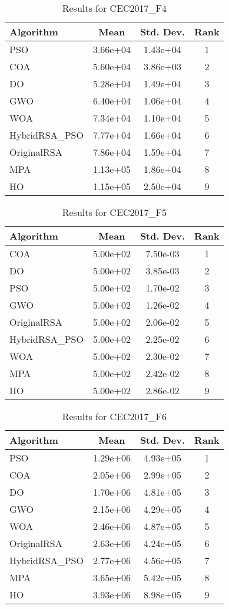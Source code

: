 \documentclass[12pt]{article}
\begin{document}
\begin{table}[H]
\centering
\caption{Results for CEC2017\_F4}
\begin{tabular}{|l|c|c|c|}
\hline
\textbf{Algorithm} & \textbf{Mean} & \textbf{Std. Dev.} & \textbf{Rank} \\
\hline
PSO & 3.66e+04 & 1.43e+04 & 1 \\
COA & 5.60e+04 & 3.86e+03 & 2 \\
DO & 5.28e+04 & 1.49e+04 & 3 \\
GWO & 6.40e+04 & 1.06e+04 & 4 \\
WOA & 7.34e+04 & 1.10e+04 & 5 \\
HybridRSA\_PSO & 7.77e+04 & 1.66e+04 & 6 \\
OriginalRSA & 7.86e+04 & 1.59e+04 & 7 \\
MPA & 1.13e+05 & 1.86e+04 & 8 \\
HO & 1.15e+05 & 2.50e+04 & 9 \\
\hline
\end{tabular}
\end{table}

\begin{table}[H]
\centering
\caption{Results for CEC2017\_F5}
\begin{tabular}{|l|c|c|c|}
\hline
\textbf{Algorithm} & \textbf{Mean} & \textbf{Std. Dev.} & \textbf{Rank} \\
\hline
COA & 5.00e+02 & 7.50e-03 & 1 \\
DO & 5.00e+02 & 3.85e-03 & 2 \\
PSO & 5.00e+02 & 1.70e-02 & 3 \\
GWO & 5.00e+02 & 1.26e-02 & 4 \\
OriginalRSA & 5.00e+02 & 2.06e-02 & 5 \\
HybridRSA\_PSO & 5.00e+02 & 2.25e-02 & 6 \\
WOA & 5.00e+02 & 2.30e-02 & 7 \\
MPA & 5.00e+02 & 2.42e-02 & 8 \\
HO & 5.00e+02 & 2.86e-02 & 9 \\
\hline
\end{tabular}
\end{table}

\begin{table}[H]
\centering
\caption{Results for CEC2017\_F6}
\begin{tabular}{|l|c|c|c|}
\hline
\textbf{Algorithm} & \textbf{Mean} & \textbf{Std. Dev.} & \textbf{Rank} \\
\hline
PSO & 1.29e+06 & 4.93e+05 & 1 \\
COA & 2.05e+06 & 2.99e+05 & 2 \\
DO & 1.70e+06 & 4.81e+05 & 3 \\
GWO & 2.15e+06 & 4.29e+05 & 4 \\
WOA & 2.46e+06 & 4.87e+05 & 5 \\
OriginalRSA & 2.63e+06 & 4.24e+05 & 6 \\
HybridRSA\_PSO & 2.77e+06 & 4.56e+05 & 7 \\
MPA & 3.65e+06 & 5.42e+05 & 8 \\
HO & 3.93e+06 & 8.98e+05 & 9 \\
\hline
\end{tabular}
\end{table}
\end{document}
